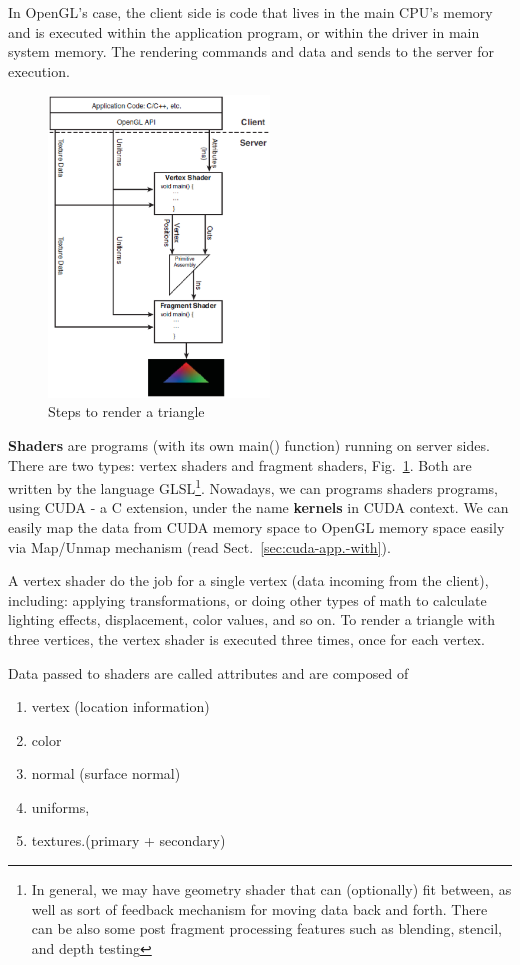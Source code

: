 In OpenGL's case, the client side is code that lives in the main CPU's
memory and is executed within the application program, or within the
driver in main system memory.  The rendering commands and data and
sends to the server for execution.
\begin{figure}[hbt]
  \centerline{\includegraphics[height=8cm,
    angle=0]{./images/client_server.eps}}
  \caption{Steps to render a triangle}
  \label{fig:client_server}
\end{figure}

{\bf Shaders} are programs (with its own main() function) running on
server sides. There are two types: vertex shaders and fragment
shaders, Fig.~\ref{fig:client_server}. Both are written by the
language
GLSL\footnote{In general, we may have geometry shader that can
  (optionally) fit between, as well as sort of feedback mechanism for
  moving data back and forth. There can be also some post fragment
  processing features such as blending, stencil, and depth testing}.
Nowadays, we can programs shaders programs, using CUDA - a C
extension, under the name {\bf kernels} in CUDA context. We can easily
map the data from CUDA memory space to OpenGL memory space easily via
Map/Unmap mechanism (read Sect.~\ref{sec:cuda-app.-with}).

A vertex shader do the job for a single vertex (data incoming from the
client), including: applying transformations, or doing other types of
math to calculate lighting effects, displacement, color values, and so
on. To render a triangle with three vertices, the vertex shader is
executed three times, once for each vertex.

Data passed to shaders are called attributes and are composed of
\begin{enumerate}
\item vertex (location information)

\item color

\item normal (surface normal)

\item uniforms, 

\item textures.(primary + secondary)
\end{enumerate}


